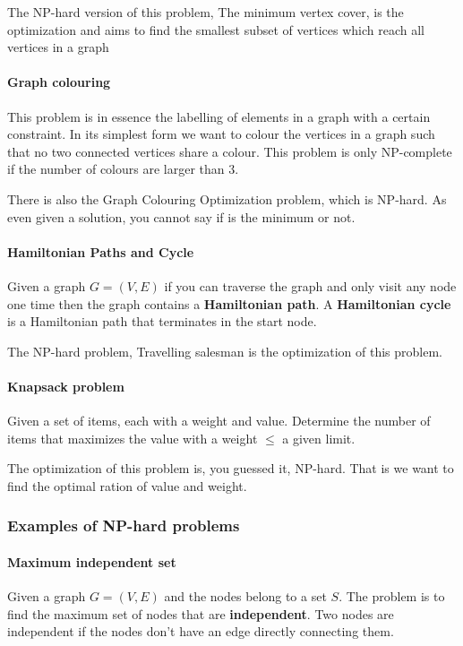 \documentclass[12pt]{article} %
\begin{document}
\par The NP-hard version of this problem, The minimum vertex cover, is the optimization and aims to find the smallest subset of vertices which reach all vertices in a graph 

\paragraph{Graph colouring}
This problem is in essence the labelling of elements in a graph with a certain constraint. In its simplest form we want to colour the vertices in a graph such that no two connected vertices share a colour. This problem is only NP-complete if the number of colours are larger than 3.

\par There is also the Graph Colouring Optimization problem, which is NP-hard. As even given a solution, you cannot say if is the minimum or not.

\paragraph{Hamiltonian Paths and Cycle}
Given a graph $G = (V, E)$ if you can traverse the graph and only visit any node one time then the graph contains a \textbf{Hamiltonian path}. A \textbf{Hamiltonian cycle} is a Hamiltonian path that terminates in the start node.

\par The NP-hard problem, Travelling salesman is the optimization of this problem.

\paragraph{Knapsack problem}
Given a set of items, each with a weight and value. Determine the number of items that maximizes the value with a weight $\leq$ a given limit.  

\par The optimization of this problem is, you guessed it, NP-hard. That is we want to find the optimal ration of value and weight.

\subsubsection{Examples of NP-hard problems}

\paragraph{Maximum independent set}
Given a graph $G = (V, E)$ and the nodes belong to a set $S$. The problem is to find the maximum set of nodes that are \textbf{independent}. Two nodes are independent if the nodes don't have an edge directly connecting them.
\end{document}
